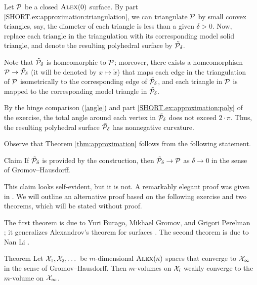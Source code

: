Let $\mathcal{P}$ be a closed $\textup{\textsc{Alex}}(0)$ surface.
By part \ref{SHORT.ex:approximation:triangulation}, we can triangulate $\mathcal{P}$ by small convex triangles, say, the diameter of each triangle is less than a given $\delta>0$.
Now, replace each triangle in the triangulation with its corresponding model solid triangle, and denote the resulting polyhedral surface by $\tilde{\mathcal{P}}_\delta$.

Note that $\tilde{\mathcal{P}}_\delta$ is homeomorphic to $\mathcal{P}$;
moreover, there exists a homeomorphism $\mathcal{P} \to \tilde{\mathcal{P}}_\delta$ (it will be denoted by $x\mapsto \tilde x$) that maps each edge in the triangulation of $\mathcal{P}$ isometrically to the corresponding edge of $\tilde{\mathcal{P}}_\delta$, and each triangle in $\mathcal{P}$ is mapped to the corresponding model triangle in $\tilde{\mathcal{P}}_\delta$.

By the hinge comparison (\ref{angle}) and part \ref{SHORT.ex:approximation:poly} of the exercise, the total angle around each vertex in $\tilde{\mathcal{P}}_\delta$ does not exceed $2\cdot\pi$.
Thus, the resulting polyhedral surface $\tilde{\mathcal{P}}_\delta$ has nonnegative curvature.

\medskip

Observe that Theorem \ref{thm:approximation} follows from the following statement.

\begin{thm}{Claim}\label{clm:approximation}
If $\tilde{\mathcal{P}}_\delta$ is provided by the construction, then $\tilde{\mathcal{P}}_\delta\to\mathcal{P}$ as $\delta\to 0$ in the sense of Gromov--Hausdorff.
\end{thm}

This claim looks self-evident, but it is not.
A remarkably elegant proof was given in \cite[VII §~6]{alexandrov-1948}.
We will outline an alternative proof based on the following exercise and two theorems, which will be stated without proof.

The first theorem is due to Yuri Burago, Mikhael Gromov, and Grigori Perelman \cite[10.8]{burago-gromov-perelman};
it generalizes Alexandrov's theorem for surfaces \cite[X §~2]{alexandrov-1948}.
The second theorem is due to Nan Li \cite{li}.

\begin{thm}{Theorem}\label{thm:cont-vol}
Let $\mathcal{X}_1, \mathcal{X}_2,\dots$ be $m$-dimensional $\textup{\textsc{Alex}}(\kappa)$ spaces that converge to $\mathcal{X}_\infty$ in the sense of Gromov--Hausdorff.
Then $m$-volumes on $\mathcal{X}_i$ weakly converge to the $m$-volume on $\mathcal{X}_\infty$.
\end{thm}


